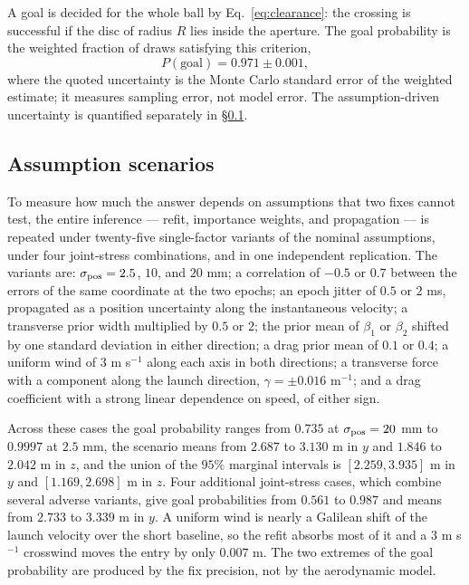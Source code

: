 A goal is decided for the whole ball by Eq.~\eqref{eq:clearance}: the crossing
is successful if the disc of radius $R$ lies inside the aperture. The goal
probability is the weighted fraction of draws satisfying this criterion,
\begin{equation}
  P(\text{goal})=0.971\pm0.001,
  \label{eq:pgoal}
\end{equation}
where the quoted uncertainty is the Monte Carlo standard error of the weighted
estimate; it measures sampling error, not model error. The assumption-driven
uncertainty is quantified separately in \S\ref{sec:scenarios}.

\subsection{Assumption scenarios}
\label{sec:scenarios}

To measure how much the answer depends on assumptions that two fixes cannot
test, the entire inference --- refit, importance weights, and propagation --- is
repeated under twenty-five single-factor variants of the nominal assumptions,
under four joint-stress combinations, and in one independent replication. The variants are:
$\sigma_{\rm pos}=2.5$, $10$, and $20$ mm; a correlation of $-0.5$ or $0.7$
between the errors of the same coordinate at the two epochs; an epoch jitter of
$0.5$ or $2$ ms, propagated as a position uncertainty along the instantaneous
velocity; a transverse prior width multiplied by $0.5$ or $2$; the prior mean of
$\beta_1$ or $\beta_2$ shifted by one standard deviation in either direction; a
drag prior mean of $0.1$ or $0.4$; a uniform wind of $3$ m s$^{-1}$ along each
axis in both directions; a transverse force with a component along the launch
direction, $\gamma=\pm0.016$ m$^{-1}$; and a drag coefficient with a strong
linear dependence on speed, of either sign.

Across these cases the goal probability ranges from $0.735$ at
$\sigma_{\rm pos}=20$ mm to $0.9997$ at $2.5$ mm, the scenario means from
$2.687$ to $3.130$ m in $y$ and $1.846$ to $2.042$ m in $z$, and the union of
the $95\%$ marginal intervals is $[2.259,3.935]$ m in $y$ and $[1.169,2.698]$ m
in $z$. Four additional joint-stress cases, which combine several adverse
variants, give goal probabilities from $0.561$ to $0.987$ and means from
$2.733$ to $3.339$ m in $y$. A uniform wind is nearly a Galilean
shift of the launch velocity over the short baseline, so the
refit absorbs most of it and a $3$ m s$^{-1}$ crosswind moves the entry by only
$0.007$ m. The two extremes of the goal probability are produced by the fix
precision, not by the aerodynamic model.

